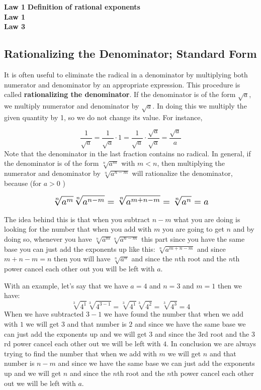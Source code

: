 \textbf{Law 1}
\textbf{Definition of rational exponents} \\
\textbf{Law 1} \\
\textbf{Law 3} \\

\subsection{Rationalizing the Denominator; Standard Form}
It is often useful to eliminate the radical in a denominator by multiplying both numerator and denominator by an appropriate expression. This procedure is called \textbf{rationalizing the denominator}. If the denominator is of the form $\sqrt{a}$, we multiply numerator
and denominator by $\sqrt{a}$. In doing this we multiply the given quantity by 1, so we do
not change its value. For instance,

$$
\displaystyle \frac{1}{\sqrt{a}}=\frac{1}{\sqrt{a}} \cdot 1=\frac{1}{\sqrt{a}} \cdot \frac{\sqrt{a}}{\sqrt{a}}=\frac{\sqrt{a}}{a}
$$
Note that the denominator in the last fraction contains no radical. In general, if the denominator is of the form $\sqrt[n]{a^m}$ with $m<n$, then multiplying the numerator and denominator by $\sqrt[n]{a^{n-m}}$ will rationalize the denominator, because (for $a>0$ )

\begin{align*}
  \scalebox{1.3}{$
\displaystyle \sqrt[n]{a^m} \sqrt[n]{a^{n-m}}=\sqrt[n]{a^{m+n-m}}=\sqrt[n]{a^n}=a
$}
\end{align*}

The idea behind this is that when you subtract $n-m$ what you are doing is looking for the number that when you add with $m$ you are going to get $n$ and by doing so, whenever you have $\sqrt[n]{a^m} \sqrt[n]{a^{n-m}}$ this part since you have the same base you can just add the exponents up like this: $ \sqrt[n]{a^{m+n-m}} $ and since $ m+n-m = n $ then you will have $ \sqrt[n]{a^n} $ and since the $ n $th root and the $ n $th power cancel each other out you will be left with $ a $.

With an example, let's say that we have $a=4$ and $n=3$ and $m=1$ then we have:
$$ \sqrt[3]{4^1} \sqrt[3]{4^{3-1}} = \sqrt[3]{4^1} \sqrt[3]{4^2} = \sqrt[3]{4^3} = 4 $$
When we have subtracted $ 3-1 $ we have found the number that when we add with $ 1 $ we will get $ 3 $ and that number is $ 2 $ and since we have the same base we can just add the exponents up and we will get $ 3 $ and since the $ 3 $rd root and the $ 3 $rd power cancel each other out we will be left with $ 4 $. 
In conclusion we are always trying to find the number that when we add with $ m $ we will get $ n $ and that number is $ n-m $ and since we have the same base we can just add the exponents up and we will get $ n $ and since the $ n $th root and the $ n $th power cancel each other out we will be left with $ a $. 

